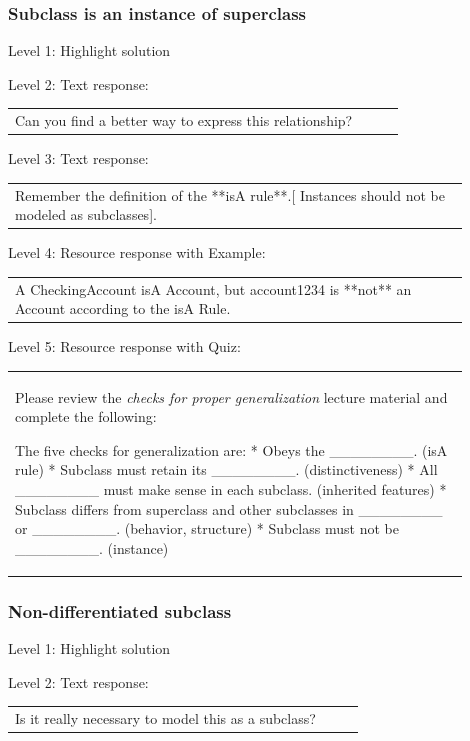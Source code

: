 \subsubsection{Subclass is an instance of superclass}

\noindent Level 1: Highlight solution \medskip

\noindent Level 2: Text response: \medskip

\begin{tabular}{|p{0.9\linewidth}}
Can you find a better way to express this relationship?
\end{tabular} \medskip

\noindent Level 3: Text response: \medskip

\begin{tabular}{|p{0.9\linewidth}}
Remember the definition of the **isA rule**.[ Instances should not be modeled as subclasses].
\end{tabular} \medskip

\noindent Level 4: Resource response with Example: \medskip

\begin{tabular}{|p{0.9\linewidth}}
A CheckingAccount isA Account, but account1234 is **not** an Account according to the isA Rule.
\end{tabular} \medskip

\noindent Level 5: Resource response with Quiz: \medskip

\begin{tabular}{|p{0.9\linewidth}}
Please review the \textit{checks for proper generalization} lecture material
and complete the following:

The five checks for generalization are:
* Obeys the ________. (isA rule)
* Subclass must retain its ________. (distinctiveness)
* All ________ must make sense in each subclass. (inherited features)
* Subclass differs from superclass and other subclasses in ________ or ________. 
(behavior, structure)
* Subclass must not be ________. (instance)
\end{tabular} \medskip


\subsubsection{Non-differentiated subclass}

\noindent Level 1: Highlight solution \medskip

\noindent Level 2: Text response: \medskip

\begin{tabular}{|p{0.9\linewidth}}
Is it really necessary to model this as a subclass?
\end{tabular} \medskip

